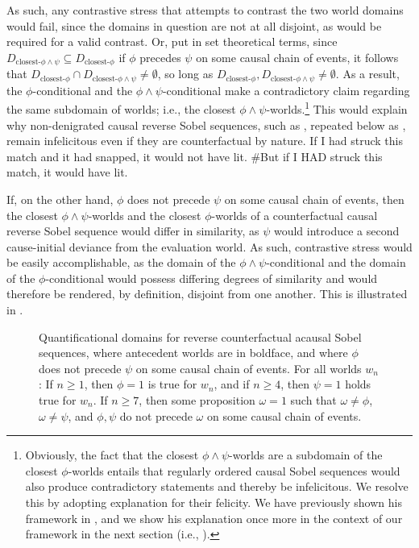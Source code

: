 As such, any contrastive stress that attempts to contrast the two world domains would fail, since the domains in question are not at all disjoint, as would be required for a valid contrast. Or, put in set theoretical terms, since $D_{\text{closest-}\phi\land\psi}\subseteq D_{\text{closest-}\phi}$ if $\phi$ precedes $\psi$ on some causal chain of events, it follows that $D_{\text{closest-}\phi}\cap D_{\text{closest-}\phi\land\psi}\not=\emptyset$, so long as $D_{\text{closest-}\phi},D_{\text{closest-}\phi\land\psi}\not=\emptyset$. As a result, the $\phi$-conditional and the $\phi\land\psi$-conditional make a contradictory claim regarding the same subdomain of worlds; i.e., the closest $\phi\land\psi$-worlds.\footnote{Obviously, the fact that the closest $\phi\land\psi$-worlds are a subdomain of the closest $\phi$-worlds entails that regularly ordered causal Sobel sequences would also produce contradictory statements and thereby be infelicitous. We resolve this by adopting  explanation for their felicity. We have previously shown his framework in , and we show his explanation once more in the context of our framework in the next section (i.e., ).}
This would explain why non-denigrated causal reverse Sobel sequences, such as , repeated below as , remain infelicitous even if they are counterfactual by nature.
\ex{}If I had struck this match and it had snapped, it would not have lit. \#But if I \MakeUppercase{had} struck this match, it would have lit.
\xe

If, on the other hand, $\phi$ does not precede $\psi$ on some causal chain of events, then the closest $\phi\land\psi$-worlds and the closest $\phi$-worlds of a counterfactual causal reverse Sobel sequence would differ in similarity, as $\psi$ would introduce a second cause-initial deviance from the evaluation world. As such, contrastive stress would be easily accomplishable, as the domain of the $\phi\land\psi$-conditional and the domain of the $\phi$-conditional would possess differing degrees of similarity and would therefore be rendered, by definition, disjoint from one another. This is illustrated in .
\begin{figure}[!htb]

\caption{Quantificational domains for reverse counterfactual acausal Sobel sequences, where antecedent worlds are in boldface, and where $\phi$ does not precede $\psi$ on some causal chain of events. For all worlds $w_n$: If $n\geqslant1$, then $\phi=1$ is true for $w_n$, and if $n\geqslant 4$, then $\psi=1$ holds true for $w_n$. If $n\geqslant 7$, then some proposition $\omega=1$ such that $\omega\neq\phi$, $\omega\neq\psi$, and $\phi,\psi$ do not precede $\omega$ on some causal chain of events.}
\end{figure}

